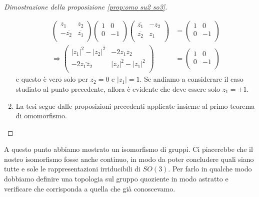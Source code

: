 \documentclass[11pt]{article}
\theoremstyle{plain}
\theoremstyle{definition}
\theoremstyle{remark}
\begin{document}
\begin{proof}[Dimostrazione della proposizione \ref{prop:omo su2 so3}]
\begin{enumerate}
{     \begin{align*}
     \left(
     \begin{array}{cc}
       z_1 & z_2 \\
       -\overline{z_2} & \overline{z_1} \\
     \end{array}
     \right)
     \left(
     \begin{array}{cc}
       1 & 0 \\
       0 & -1 \\
     \end{array}
     \right)
     \left(
     \begin{array}{cc}
       \overline{z_1} & -z_2 \\
       \overline{z_2} & z_1 \\
     \end{array}
     \right)
     &=
      \left(
     \begin{array}{cc}
       1 & 0 \\
       0 & -1 \\
     \end{array}
     \right) \\
     \Rightarrow
      \left(
     \begin{array}{cc}
       |z_1|^2-|z_2|^2 & -2z_1z_2 \\
       -2 \overline{z_1z_2} & |z_2|^2 - |z_1|^2 \\
     \end{array}
     \right)
     &=
     \left(
     \begin{array}{cc}
       1 & 0 \\
       0 & -1 \\
     \end{array}
     \right)
     \end{align*}
     e questo è vero solo per $z_2 = 0$ e $|z_1| = 1$. Se andiamo a considerare il caso studiato al punto precedente, allora è evidente che deve essere solo $z_1 = \pm 1$.


   }
     \item La tesi segue dalle proposizioni precedenti applicate insieme al primo teorema di omomorfismo.
   \end{enumerate}
	\end{proof}



   A questo punto abbiamo mostrato un isomorfismo di gruppi. Ci piacerebbe che il nostro isomorfismo fosse anche continuo, in modo da poter concludere quali siano tutte e sole le rappresentazioni irriducibili di $SO(3)$. Per farlo in qualche modo dobbiamo definire una topologia sul gruppo quoziente in modo astratto e verificare che corrisponda a quella che già conoscevamo.
\end{document}
